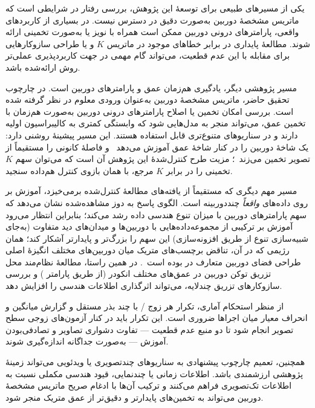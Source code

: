 یکی از مسیرهای طبیعی برای توسعهٔ این پژوهش،
بررسی رفتار \proposedmodel{}
در شرایطی است که ماتریس مشخصهٔ دوربین
به‌صورت دقیق در دسترس نیست.
در بسیاری از کاربردهای واقعی،
پارامترهای درونی دوربین
ممکن است همراه با نویز
یا به‌صورت تخمینی ارائه شوند.
مطالعهٔ پایداری \proposedmodel{}
در برابر خطاهای موجود در ماتریس $K$
و یا طراحی سازوکارهایی
برای مقابله با این عدم قطعیت،
می‌تواند گام مهمی در جهت کاربردپذیری عملی‌تر
روش ارائه‌شده باشد.

مسیر پژوهشی دیگر،
یادگیری هم‌زمان عمق و پارامترهای دوربین است.
در چارچوب تحقیق حاضر،
ماتریس مشخصهٔ دوربین
به‌عنوان ورودی معلوم در نظر گرفته شده است.
بررسی امکان تخمین یا اصلاح پارامترهای درونی دوربین
به‌صورت هم‌زمان با تخمین عمق،
می‌تواند منجر به مدل‌هایی شود
که وابستگی کمتری به کالیبراسیون اولیه دارند
و در سناریوهای متنوع‌تری قابل استفاده هستند.
این مسیر پیشینهٔ روشنی دارد:
 یک شاخهٔ دوربین را در کنار شاخهٔ عمق آموزش
می‌دهد~\cite{Piccinelli2024UniDepth} و  فاصلهٔ کانونی را
مستقیماً از تصویر تخمین می‌زند~\cite{Bochkovskii2025DepthPro}؛
مزیت طرح کنترل‌شدهٔ این پژوهش آن است که می‌توان سهم $K$ تخمینی را در برابر
$K$ مرجع، با همان بازوی کنترل هم‌داده سنجید.

مسیر مهم دیگری که مستقیماً از یافته‌های مطالعهٔ کنترل‌شده برمی‌خیزد،
آموزش بر روی داده‌های \emph{واقعاً} چنددوربینه است.
الگوی پاسخ به دوز مشاهده‌شده نشان می‌دهد که
سهم پارامترهای دوربین با میزان تنوع هندسی داده رشد می‌کند؛
بنابراین انتظار می‌رود آموزش بر ترکیبی از مجموعه‌داده‌هایی
با دوربین‌ها و میدان‌های دید متفاوت
(به‌جای شبیه‌سازی تنوع از طریق افزونه‌سازی)
این سهم را بزرگ‌تر و پایدارتر آشکار کند؛
همان رژیمی که در آن، تناقض برچسب‌های متریک میان دوربین‌های مختلف
انگیزهٔ اصلی طراحی فضای دوربین متعارف در  بوده
است~\cite{Yin2023Metric3D}.
در همین راستا، مطالعهٔ نظام‌مند محل تزریق توکن دوربین
در عمق‌های مختلف انکودر
(از طریق پارامتر )
و بررسی سازوکارهای تزریق چندلایه،
می‌تواند اثرگذاری اطلاعات هندسی را افزایش دهد.

از منظر استحکام آماری، تکرار هر زوج \proposedmodel{}/\controlmodel{} با چند بذر مستقل و گزارش میانگین و انحراف معیار میان اجراها ضروری است. این تکرار باید در کنار آزمون‌های زوجی سطح تصویر انجام شود تا دو منبع عدم قطعیت --- تفاوت دشواری تصاویر و تصادفی‌بودن آموزش --- به‌صورت جداگانه اندازه‌گیری شوند.

همچنین،
تعمیم چارچوب پیشنهادی
به سناریوهای چندتصویری یا ویدئویی
می‌تواند زمینهٔ پژوهشی ارزشمندی باشد.
اطلاعات زمانی یا چندنمایی،
قیود هندسی مکملی نسبت به اطلاعات تک‌تصویری فراهم می‌کنند
و ترکیب آن‌ها با ادغام صریح ماتریس مشخصهٔ دوربین
می‌تواند به تخمین‌های پایدارتر و دقیق‌تر
از عمق متریک منجر شود.


